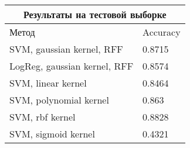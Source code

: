 \begin{itemize}
         
         \begin{tabular}{ |p{5cm}|p{5cm}|  }
        \hline
        \multicolumn{2}{|c|}{Результаты на тестовой выборке} \\
        \hline
        Метод & Accuracy\\
        \hline
        SVM, gaussian kernel,  RFF   & 0.8715\\
        LogReg, gaussian kernel,  RFF   & 0.8574\\
        SVM, linear kernel   & 0.8464\\
        SVM, polynomial kernel    & 0.863\\
        SVM, rbf kernel    & 0.8828\\
        SVM, sigmoid kernel    & 0.4321\\
        \hline
        \end{tabular}
\end{itemize}